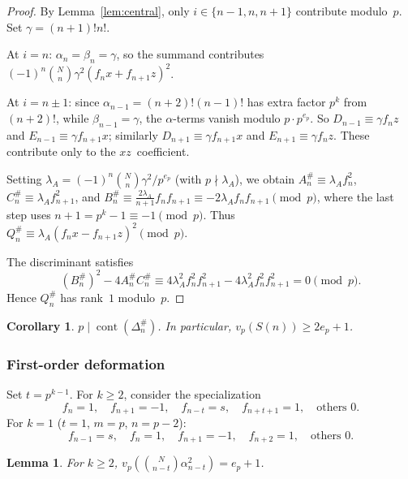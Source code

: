 \documentclass[10pt]{amsart}
\newtheorem{lemma}[theorem]{Lemma}
\newtheorem{corollary}[theorem]{Corollary}
\theoremstyle{definition}
\theoremstyle{remark}
\DeclareMathOperator{\cont}{cont}
\begin{document}
\begin{proof}
By Lemma~\ref{lem:central}, only $i \in \{n-1,n,n+1\}$ contribute
modulo~$p$.  Set $\gamma = (n+1)!n!$.

At $i = n$: $\alpha_n = \beta_n = \gamma$, so the summand contributes
$(-1)^n\binom{N}{n}\gamma^2(f_nx+f_{n+1}z)^2$.

At $i = n \pm 1$: since $\alpha_{n-1} = (n+2)!(n-1)!$ has extra factor
$p^k$ from $(n+2)!$, while $\beta_{n-1} = \gamma$, the $\alpha$-terms
vanish modulo $p \cdot p^{e_p}$.  So $D_{n-1} \equiv \gamma f_n z$ and
$E_{n-1} \equiv \gamma f_{n+1} x$; similarly $D_{n+1} \equiv \gamma f_{n+1} x$
and $E_{n+1} \equiv \gamma f_n z$.  These contribute only to the
$xz$~coefficient.

Setting $\lambda_A = (-1)^n\binom{N}{n}\gamma^2/p^{e_p}$ (with
$p \nmid \lambda_A$), we obtain
$A_n^{\#} \equiv \lambda_A f_n^2$, \;
$C_n^{\#} \equiv \lambda_A f_{n+1}^2$, \; and
$B_n^{\#} \equiv \frac{2\lambda_A}{n+1} f_n f_{n+1} \equiv -2\lambda_A f_n f_{n+1}\pmod{p}$,
where the last step uses $n+1 = p^k-1 \equiv -1\pmod{p}$.
Thus $Q_n^{\#} \equiv \lambda_A(f_nx - f_{n+1}z)^2\pmod{p}$.

The discriminant satisfies
\[
(B_n^{\#})^2 - 4A_n^{\#}C_n^{\#}
\equiv 4\lambda_A^2 f_n^2f_{n+1}^2 - 4\lambda_A^2 f_n^2f_{n+1}^2
= 0 \pmod{p}.
\]
Hence $Q_n^{\#}$ has rank~$1$ modulo~$p$.
\end{proof}

\begin{corollary}\label{cor:rank1disc}
$p \mid \cont(\Delta_n^{\#})$.  In particular, $v_p(S(n)) \ge 2e_p + 1$.
\end{corollary}

\subsubsection*{First-order deformation}

Set $t = p^{k-1}$.  For $k \ge 2$, consider the specialization
\begin{equation}\label{eq:spec}
f_n = 1, \quad f_{n+1} = -1, \quad f_{n-t} = s, \quad f_{n+t+1} = 1,
\quad \text{others } 0.
\end{equation}
For $k = 1$ ($t = 1$, $m = p$, $n = p-2$):
\begin{equation}\label{eq:speck1}
f_{n-1} = s, \quad f_n = 1, \quad f_{n+1} = -1, \quad f_{n+2} = 1,
\quad \text{others } 0.
\end{equation}

\begin{lemma}\label{lem:offcentre}
For $k \ge 2$,
$v_p(\binom{N}{n-t}\alpha_{n-t}^2) = e_p + 1$.
\end{lemma}
\end{document}
